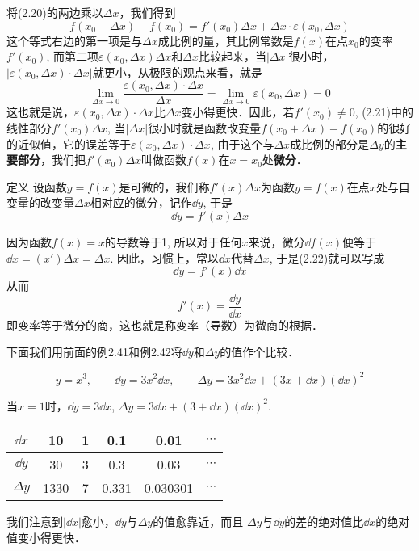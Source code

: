 将(2.20)的两边乘以$\Delta x$，我们得到
\begin{equation}
    f(x_0+\Delta x)-f(x_0)=f'(x_0)\Delta x+\Delta x\cdot \varepsilon(x_0,\Delta x)
\end{equation}
这个等式右边的第一项是与$\Delta x$成比例的量，其比例常数是$f(x)$在点$x_0$的变率$f'(x_0)$, 而第二项$\varepsilon(x_0,\Delta x)\Delta x$和$\Delta x$比较起来，当$|\Delta x|$很小时，$|\varepsilon(x_0,\Delta x)\cdot \Delta x|$就更小，从极限的观点来看，就是
\[\lim_{\Delta x\to 0} \frac{\varepsilon(x_0,\Delta x)\cdot \Delta x}{\Delta x} =\lim_{\Delta x\to 0}\varepsilon(x_0,\Delta x)   =0\]
这也就是说，$\varepsilon(x_0,\Delta x)\cdot \Delta x$比$\Delta x$变小得更快．因此，若$f'(x_0)\ne 0$, (2.21)中的线性部分$f'(x_0)\Delta x$, 当$|\Delta x|$很小时就是函数改变量$f(x_0+\Delta x)-f(x_0)$的很好的近似值，它的误差等于$\varepsilon(x_0,\Delta x)\cdot \Delta x$, 由于这个与$\Delta x$成比例的部分是$\Delta y$的\textbf{主要部分}，我们把$f'(x_0)\Delta x$叫做函数$f(x)$在$x=x_0$处\textbf{微分}．

\begin{blk}
    {定义} 设函数$y=f(x)$是可微的，我们称$f'(x)\Delta x$为函数$y=f(x)$在点$x$处与自变量的改变量$\Delta x$相对应的微分，记作$\dd y$, 于是
\begin{equation}
   \dd y=f' (x) \Delta x 
\end{equation}
\end{blk}

因为函数$f(x)=x$的导数等于1, 所以对于任何$x$来说，微分$\dd f(x)$便等于$\dd x=(x')\Delta x=\Delta x$. 因此，习惯上，常以$\dd x$代替$\Delta x$, 于是(2.22)就可以写成
\begin{equation}
    \dd y=f'(x)\dd x
\end{equation}
从而
\[f' (x) =\frac{\dd y}{\dd x}\]
即变率等于微分的商，这也就是称变率（导数）为微商的根据．

下面我们用前面的例2.41和例2.42将$\dd y$和$\Delta y$的值作个比较．


\begin{example}
\[y=x^3,\qquad \dd y=3x^2\dd x,\qquad \Delta y=3x^2\dd x+(3x+\dd x)(\dd x)^2\]

当$x=1$时，$\dd y=3\dd x$, $\Delta y=3\dd x+(3+\dd x)(\dd x)^2$.

\begin{center}
\begin{tabular}{cccccc}
    \hline
$\dd x$ & 10& 1& 0.1 & 0.01& $\cdots$\\
    \hline
$\dd y$& 30&3&0.3& 0.03&$\cdots$\\
\hline
$\Delta y$& 1330& 7&0.331&0.030301&$\cdots$\\
    \hline
\end{tabular}
\end{center}
我们注意到$|\dd x|$愈小，$\dd y$与$\Delta y$的值愈靠近，而且 $\Delta y$与$\dd y$的差的绝对值比$\dd x$的绝对值变小得更快．
\end{example}

